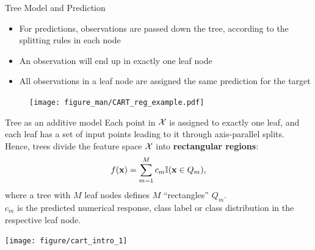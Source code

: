 \documentclass[11pt,compress,t,notes=noshow, xcolor=table]{beamer}
\begin{document}
\begin{vbframe}{Tree Model and Prediction}
  \begin{itemize}
    \item For predictions, observations are passed down the tree, according to the splitting rules
      in each node
    \item An observation will end up in exactly one leaf node
    \item All observations in a leaf node are assigned the same prediction for the target
  \end{itemize}
    \begin{figure}
    \centering
      \texttt{[image: figure\_man/CART\_reg\_example.pdf]}
    \end{figure}
\end{vbframe}


\begin{vbframe}{Tree as an additive model}
Each point in $\mathcal{X}$ is assigned to exactly one leaf, and each leaf has a set of input points leading to it through axis-parallel splits.\\
Hence, trees divide the feature space $\mathcal{X}$ into \textbf{rectangular regions}: 
  \begin{align*}
    f(\mathbf{x}) = \sum_{m=1}^M c_m \mathbb{I}(\mathbf{x} \in Q_m),
  \end{align*}
  where a tree with $M$ leaf nodes defines $M$ \enquote{rectangles} $Q_m$.\\
  $c_m$ is the predicted numerical response, class label or class
  distribution in the respective leaf node.

\begin{knitrout}\scriptsize
{}\color{fgcolor}

{\centering \texttt{[image: figure/cart\_intro\_1]} 

}



\end{knitrout}
\end{vbframe}
\end{document}
